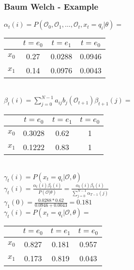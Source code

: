\begin{frame}
	\frametitle{Baum Welch - Example}
  \begin{table}
  $\alpha_t(i) = P(\mathcal{O}_0, \mathcal{O}_1, \dots ,\mathcal{O}_t , x_t = q_i | \theta) =$
  \begin{tabular}{| c | c | c | c |}
  	\hline
          & $t=e_0$ & $t=e_1$ & $t=e_0$ \\ \hline
    $x_0$ & 0.27    & 0.0288  & 0.0946 \\ \hline
    $x_1$ & 0.14    & 0.0976  & 0.0043 \\ \hline
  \end{tabular}\\
  $\beta_t(i) = \sum\limits_{j=0}^{N-1} a_{ij} b_j(\mathcal{O}_{t+1})\beta_{t+1}(j) =$
  \begin{tabular}{| c | c | c | c |}
  	\hline
          & $t=e_0$ & $t=e_1$ & $t=e_0$ \\ \hline
    $x_0$ & 0.3028  & 0.62    & 1       \\ \hline
    $x_1$ & 0.1222  & 0.83    & 1       \\ \hline
  \end{tabular}\\
  $\gamma_t(i) = P(x_t = q_i|\mathcal{O},\theta)$\\
  $\gamma_t(i) = \frac{\alpha_t(i)\beta_t(i)}{P(\mathcal{O}|\theta)} = \frac{\alpha_t(i)\beta_t(i)}{\sum\limits_{j=0}^{N-1} \alpha_{T-1}(j)}$\\
  $\gamma_1(0) = \frac{0.0288 * 0.62}{0.0946 + 0.0043} = 0.181$\\
  $\gamma_t(i) = P(x_t = q_i|\mathcal{O},\theta) =$
  \begin{tabular}{| c | c | c | c |}
  	\hline
          & $t=e_0$ & $t=e_1$ & $t=e_0$ \\ \hline
    $x_0$ & 0.827  & 0.181  & 0.957   \\ \hline
    $x_1$ & 0.173  & 0.819  & 0.043   \\ \hline
  \end{tabular}\\
\end{table}
\end{frame}

